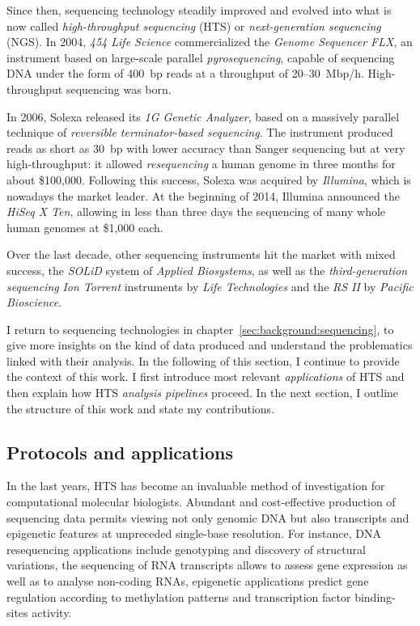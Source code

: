 Since then, sequencing technology steadily improved and evolved into what is now called \emph{high-throughput sequencing} (HTS) or \emph{next-generation sequencing} (NGS).
In 2004, \emph{454 Life Science} commercialized the \emph{Genome Sequencer FLX}, an instrument based on large-scale parallel \emph{pyrosequencing}, capable of sequencing DNA under the form of 400~bp reads at a throughput of 20--30~Mbp/h.
High-throughput sequencing was born.

In 2006, Solexa released its \emph{1G Genetic Analyzer}, based on a massively parallel technique of \emph{reversible terminator-based sequencing}.
The instrument produced reads as short as 30~bp with lower accuracy than Sanger sequencing but at very high-throughput: it allowed \emph{resequencing} a human genome in three months for about \$100,000.
Following this success, Solexa was acquired by \emph{Illumina}, which is nowadays the market leader.
At the beginning of 2014, Illumina announced the \emph{HiSeq X Ten}, allowing in less than three days the sequencing of many whole human genomes at \$1,000 each.

Over the last decade, other sequencing instruments hit the market with mixed success, \eg the \emph{SOLiD} system of \emph{Applied Biosystems}, as well as the \emph{third-generation sequencing} \emph{Ion Torrent} instruments by \emph{Life Technologies} and the \emph{RS II} by \emph{Pacific Bioscience}.

I return to sequencing technologies in chapter~\ref{sec:background:sequencing}, to give more insights on the kind of data produced and understand the problematics linked with their analysis.
In the following of this section, I continue to provide the context of this work.
I first introduce most relevant \emph{applications} of HTS and then explain how HTS \emph{analysis pipelines} proceed.
In the next section, I outline the structure of this work and state my contributions.

\subsection{Protocols and applications}

In the last years, HTS has become an invaluable method of investigation for computational molecular biologists.
Abundant and cost-effective production of sequencing data permits viewing not only genomic DNA but also transcripts and epigenetic features at unpreceded single-base resolution.
For instance, DNA resequencing applications include genotyping and discovery of structural variations, the sequencing of RNA transcripts allows to assess gene expression as well as to analyse non-coding RNAs, epigenetic applications predict gene regulation according to methylation patterns and transcription factor binding-sites activity.

